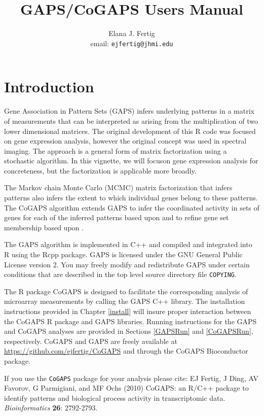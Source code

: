 \documentclass{report}
\author{Elana J. Fertig \\
email: \texttt{ejfertig@jhmi.edu}}
\title{GAPS/CoGAPS Users Manual}
\begin{document}
\maketitle
\tableofcontents

\chapter{Introduction}

\par Gene Association in Pattern Sets (GAPS) infers underlying patterns in a matrix of measurements that can be interpreted as arising from the multiplication of two lower dimensional matrices.  The original development of this R code was focused on gene expression analysis, however the original concept was used in spectral imaging.  The approach is a general form of matrix factorization using a stochastic algorithm.  In this vignette, we will focuson gene expression analysis for concreteness, but the factorization is applicable more broadly.

The Markov chain Monte Carlo (MCMC) matrix factorization that infers patterns also infers the extent to which individual genes belong to these patterns.  The CoGAPS algorithm extends GAPS to infer the coordinated activity in sets of genes for each of the inferred patterns based upon \cite{Ochs2009} and to refine gene set membership based upon \cite{Fertig2012}.

\par The GAPS algorithm is implemented in C++ and compiled and integrated into R using the Rcpp package.  GAPS is licensed under the GNU General Public License version 2.  You may freely modify and redistribute GAPS under certain conditions that are described in the top level source directory file \nolinkurl{COPYING}.

\par The R package CoGAPS is designed to facilitate the corresponding analysis of microarray measurements by calling the GAPS C++ library.  The installation instructions provided in Chapter \ref{install} will insure proper interaction between the CoGAPS R package and GAPS libraries.  Running instructions for the GAPS and CoGAPS analyses are provided in Sections \ref{GAPSRun} and \ref{CoGAPSRun}, respectively.  CoGAPS and GAPS are freely available at \url{https://github.com/ejfertig/CoGAPS} and through the CoGAPS Bioconductor package.  

\par If you use the \texttt{CoGAPS} package for your analysis please cite:
\cite{Fertig2010} EJ Fertig, J Ding, AV Favorov, G Parmigiani, and MF Ochs (2010) CoGAPS: an R/C++ package to identify patterns and biological process activity in transcriptomic data. \textit{Bioinformatics} \textbf{26}: 2792-2793. 
\end{document}
